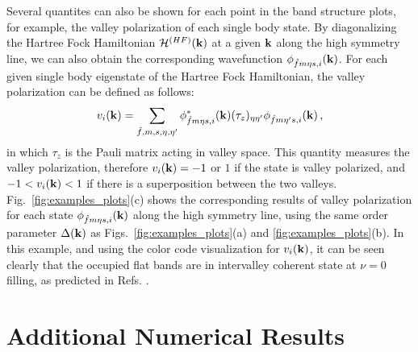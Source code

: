 \documentclass[prb,aps,nofootinbib,amssymb,twocolumn,superscriptaddress,10pt]{revtex4-2}
\begin{document}
\begin{widetext}
Several quantites can also be shown for each point in the band structure plots, for example, the valley polarization of each single body state. By diagonalizing the Hartree Fock Hamiltonian $\mathcal{H}^{(HF)}(\mathbf{k})$ at a given $\mathbf{k}$ along the high symmetry line, we can also obtain the corresponding wavefunction $\phi_{\hat{f}m\eta s, i}(\mathbf{k})$. For each given single body eigenstate of the Hartree Fock Hamiltonian, the valley polarization can be defined as follows:
\begin{equation}\label{eqn:def-valley-polarization}
	v_{i}(\mathbf{k}) = \sum_{\hat{f},m,s, \eta, \eta'}\phi_{\hat{f}m\eta s, i}^*(\mathbf{k})(\tau_z)_{\eta\eta'}\phi_{\hat{f}m\eta's, i}(\mathbf{k})\,,
\end{equation}
in which $\tau_z$ is the Pauli matrix acting in valley space. This quantity measures the valley polarization, therefore $v_i(\mathbf{k})=-1$ or $1$ if the state is valley polarized, and $-1 < v_i(\mathbf{k}) < 1$ if there is a superposition between the two valleys. Fig.~\ref{fig:examples_plots}(c) shows the corresponding results of valley polarization for each state $\phi_{\hat{f} m\eta s, i}(\mathbf{k})$ along the high symmetry line, using the same order parameter $\Delta(\mathbf{k})$ as Figs.~\ref{fig:examples_plots}(a) and \ref{fig:examples_plots}(b). In this example, and using the color code visualization for $v_i(\mathbf{k})$, it can be seen clearly that the occupied flat bands are in intervalley coherent state at $\nu=0$ filling, as predicted in Refs. \cite{BUL20a,ZHA20,LIA20}.


\section{Additional Numerical Results}\label{app_sec:numerical_results}

\end{widetext}
\end{document}

